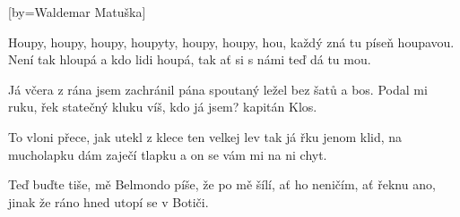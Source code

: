 [by={Waldemar Matuška}]

\beginchorus{}
Houpy, houpy, houpy, houpyty,
houpy, houpy, hou,
každý zná tu píseň houpavou.
Není tak hloupá a kdo lidi houpá,
tak ať si s námi teď dá tu mou.
\endchorus{}

\beginverse{}
Já včera z rána jsem zachránil pána
spoutaný ležel bez šatů a bos.
Podal mi ruku, řek statečný kluku
víš, kdo já jsem? kapitán Klos.
\endverse{}

\beginchorus{}
\phantom{}
\endchorus{}

\beginverse{}
To vloni přece, jak utekl z klece
ten velkej lev tak já řku jenom klid,
na mucholapku dám zaječí tlapku
a on se vám mi na ni chyt.
\endverse{}

\beginchorus{}
\phantom{}
\endchorus{}

\beginverse{}
Teď buďte tiše, mě Belmondo píše,
že po mě šílí, ať ho neničím,
ať řeknu ano, jinak že ráno
hned utopí se v Botiči.
\endverse{}

\beginchorus{}
\phantom{}
\endchorus{}

\endsong{}
